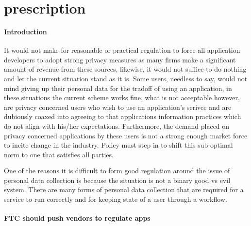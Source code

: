 \section{prescription}

	\paragraph{Introduction}

It would not make for reasonable or practical regulation to force all application developers to adopt strong privacy measures as many firms make a significant amount of revenue from these sources, likewise, it would not suffice to do nothing and let the current situation stand as it is. Some users, needless to say, would not mind giving up their personal data for the tradoff of using an application, in these situations the current scheme works fine, what is not acceptable however, are privacy concerned users who wish to use an application's serivce and are dubiously coaxed into agreeing to that applications information practices which do not align with his/her expectations. Furthermore, the demand placed on privacy concerned applications by these users is not a strong enough market force to incite change in the industry. Policy must step in to shift this sub-optimal norm to one that satisfies all parties. 



One of the reasons it is difficult to form good regulation around the issue of personal data collection is because the situation is not a binary good vs evil system. There are many forms of personal data collection that are required for a service to run correctly and for keeping state of a user through a workflow. 




\paragraph{FTC should push vendors to regulate apps}





